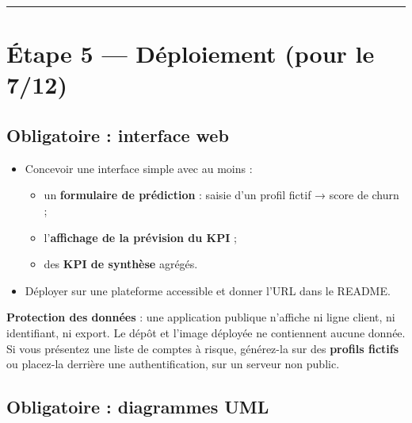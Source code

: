 \documentclass[11pt,a4paper]{article}
\renewenvironment{quote}{\begin{quotebox}}{\end{quotebox}}
\providecommand{\tightlist}{\setlength{\itemsep}{0pt}\setlength{\parskip}{0pt}}
\begin{document}
\begin{center}\rule{0.5\linewidth}{0.5pt}\end{center}

\section{Étape 5 --- Déploiement (pour le
7/12)}\label{uxe9tape-5-duxe9ploiement-pour-le-712}

\subsection{Obligatoire : interface
web}\label{obligatoire-interface-web}

\begin{itemize}
\tightlist
\item
  Concevoir une interface simple avec au moins :

  \begin{itemize}
  \tightlist
  \item
    un \textbf{formulaire de prédiction} : saisie d'un profil fictif →
    score de churn ;
  \item
    l'\textbf{affichage de la prévision du KPI} ;
  \item
    des \textbf{KPI de synthèse} agrégés.
  \end{itemize}
\item
  Déployer sur une plateforme accessible et donner l'URL dans le README.
\end{itemize}

\begin{quote}
\textbf{Protection des données} : une application publique n'affiche ni
ligne client, ni identifiant, ni export. Le dépôt et l'image déployée ne
contiennent aucune donnée. Si vous présentez une liste de comptes à
risque, générez-la sur des \textbf{profils fictifs} ou placez-la
derrière une authentification, sur un serveur non public.
\end{quote}

\subsection{Obligatoire : diagrammes
UML}\label{obligatoire-diagrammes-uml}
\end{document}
